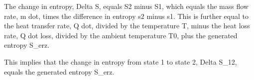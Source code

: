 The change in entropy, Delta S, equals S2 minus S1, which equals the mass flow rate, m dot, times the difference in entropy s2 minus s1. This is further equal to the heat transfer rate, Q dot, divided by the temperature T, minus the heat loss rate, Q dot loss, divided by the ambient temperature T0, plus the generated entropy S_erz.

This implies that the change in entropy from state 1 to state 2, Delta S_12, equals the generated entropy S_erz.